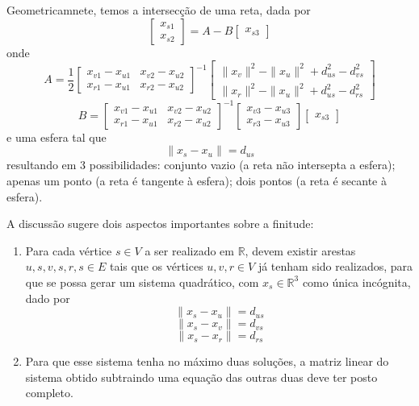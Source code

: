 \documentclass[a4paper,12pt]{article}
\begin{document}
	Geometricamnete, temos a intersecção de uma reta, dada por
	$$
	\begin{bmatrix}
	x_{s1}\\
	x_{s2}
	\end{bmatrix} =
	A -
	B
	\begin{bmatrix}
	x_{s3}
	\end{bmatrix}
	$$
	onde
	$$
	A = \frac{1}{2} \begin{bmatrix}
	x_{v1} - x_{u1} & x_{v2} - x_{u2}\\
	x_{r1} - x_{u1} & x_{r2} - x_{u2}
	\end{bmatrix}^{-1} 
	\begin{bmatrix}
	\|x_{v}\|^{2} - \|x_{u}\|^{2} + d_{us}^{2} - d_{vs}^{2}\\
	\|x_{r}\|^{2} - \|x_{u}\|^{2} + d_{us}^{2} - d_{rs}^{2}
	\end{bmatrix} 
	$$
	$$
	B = \begin{bmatrix}
	x_{v1} - x_{u1} & x_{v2} - x_{u2}\\
	x_{r1} - x_{u1} & x_{r2} - x_{u2}
	\end{bmatrix}^{-1}
	\begin{bmatrix}
	x_{v3} - x_{u3}\\
	x_{r3} - x_{u3}
	\end{bmatrix}
	\begin{bmatrix}
	x_{s3}
	\end{bmatrix}
	$$
	e uma esfera tal que
	$$
	\|x_{s} - x_{u}\|= d_{us}
	$$
	resultando em 3 possibilidades: conjunto vazio (a reta não intersepta a esfera); apenas um ponto (a reta é tangente à esfera); dois pontos (a reta é secante à esfera).
	
	A discussão sugere dois aspectos importantes sobre a finitude:
	
	\begin{enumerate}
		\item Para cada vértice $s\in V$ a ser realizado em $\mathbb{R}$, devem existir arestas ${u, s}, {v, s}, {r, s} \in E$ tais que os vértices $u, v, r \in V$ já tenham sido realizados, para que se possa gerar um sistema quadrático, com $x_{s} \in\mathbb{R}^{3}$ como única incógnita, dado por
		$$
		\|x_{s} - x_{u}\|= d_{us}
		$$
		$$
		\|x_{s} - x_{v}\|= d_{vs}
		$$
		$$
		\|x_{s} - x_{r}\|= d_{rs}
		$$
		\item Para que esse sistema tenha no máximo duas soluções, a matriz linear do sistema obtido subtraindo uma equação das outras duas deve ter posto completo.
	\end{enumerate}
	
\end{document}
